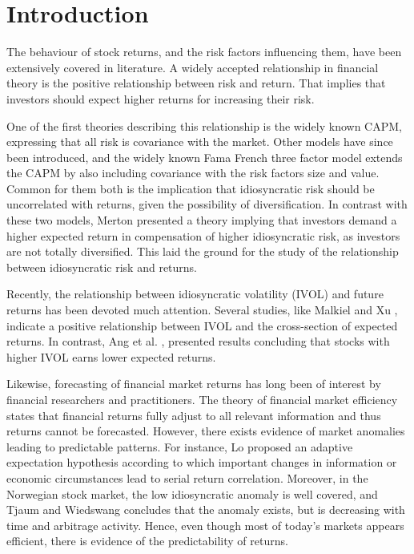 \chapter{Introduction}
The behaviour of stock returns, and the risk factors influencing them, have been extensively covered in literature. A widely accepted relationship in financial theory is the positive relationship between risk and return. That implies that investors should expect higher returns for increasing their risk.

One of the first theories describing this relationship is the widely known CAPM, expressing that all risk is covariance with the market. Other models have since been introduced, and the widely known Fama French three factor model \cite{famafrench} extends the CAPM by also including covariance with the risk factors size and value. Common for them both is the implication that idiosyncratic risk should be uncorrelated with returns, given the possibility of diversification. In contrast with these two models, Merton \cite{merton87} presented a theory implying that investors demand a higher expected return in compensation of higher idiosyncratic risk, as investors are not totally diversified. This laid the ground for the study of the relationship between idiosyncratic risk and returns.

Recently, the relationship between idiosyncratic volatility (IVOL) and future returns has been devoted much attention. Several studies, like Malkiel and Xu \cite{malkielxu02}, indicate a positive relationship between IVOL and the cross-section of expected returns. In contrast, Ang et al. \cite{angetal06}, presented results concluding that stocks with higher IVOL earns lower expected returns.

Likewise, forecasting of financial market returns has long been of interest by financial researchers and practitioners. The theory of financial market efficiency states that financial returns fully adjust to all relevant information and thus returns cannot be forecasted. However, there exists evidence of market anomalies leading to predictable patterns. For instance, Lo \cite{Lo} proposed an adaptive expectation hypothesis according to which important changes in information or economic circumstances lead to serial return correlation. Moreover, in the Norwegian stock market, the low idiosyncratic anomaly is well covered, and Tjaum and Wiedswang \cite{thaumwiedswang} concludes that the anomaly exists, but is decreasing with time and arbitrage activity. Hence, even though most of today's markets appears efficient, there is evidence of the predictability of returns.

